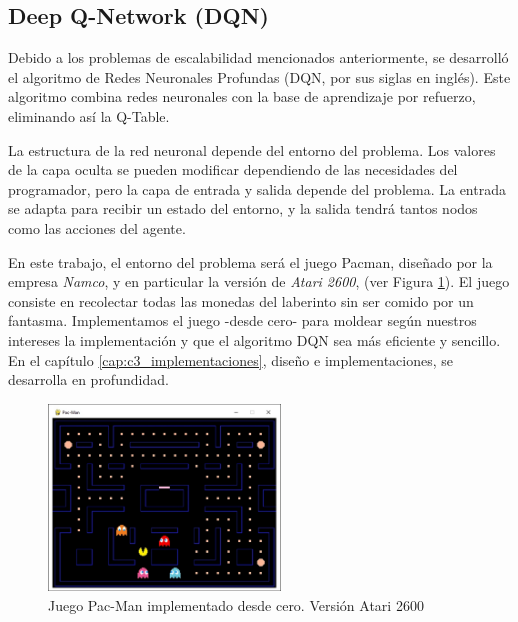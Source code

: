 	\subsection{Deep Q-Network (DQN)}
	\label{cap:2_2_2}
		Debido a los problemas de escalabilidad mencionados anteriormente, se desarrolló el algoritmo de Redes Neuronales Profundas (DQN, por sus siglas en inglés). Este algoritmo combina redes neuronales con la base de aprendizaje por refuerzo, eliminando así la Q-Table.
		
		La estructura de la red neuronal depende del entorno del problema. Los valores de la capa oculta se pueden modificar dependiendo de las necesidades del programador, pero la capa de entrada y salida depende del problema. La entrada se adapta para recibir un estado del entorno, y la salida tendrá tantos nodos como las acciones del agente. 
		
		En este trabajo, el entorno del problema será el juego Pacman, diseñado por la empresa \textit{Namco}, y en particular la versión de \textit{Atari 2600}, (ver Figura \ref{fig:pacman}). El juego consiste en recolectar todas las monedas del laberinto sin ser comido por un fantasma. Implementamos el juego -desde cero- para moldear según nuestros intereses la implementación y que el algoritmo DQN sea más eficiente y sencillo. En el capítulo \ref{cap:c3_implementaciones}, diseño e implementaciones, se desarrolla en profundidad.
		
		\begin{figure}[!h]			
			\centering
			\includegraphics[width=0.55\textwidth]{images/chapter_2/pacman}	
			\caption{Juego Pac-Man implementado desde cero. Versión Atari 2600}
			\label{fig:pacman}
		\end{figure}
		
		\newpage
		
